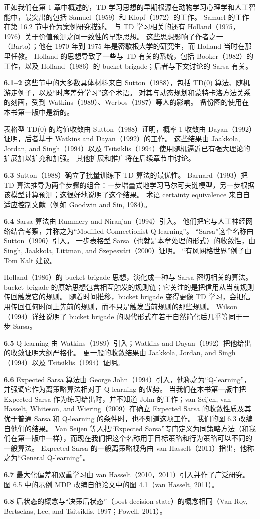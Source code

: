 \documentclass[UTF8, 12pt, fontset=fandol, oneside]{ctexart}
\begin{document}
正如我们在第 1 章中概述的，TD 学习思想的早期根源在动物学习心理学和人工智能中，最突出的包括 Samuel（1959）和 Klopf（1972）的工作。
Samuel 的工作在第 16.2 节中作为案例研究描述。
与 TD 学习相关的还有 Holland（1975，1976）关于价值预测之间一致性的早期思想。
这些思想影响了作者之一（Barto）；他在 1970 年到 1975 年是密歇根大学的研究生，而 Holland 当时在那里任教。
Holland 的思想导致了一些与 TD 有关的系统，包括 Booker（1982）的工作，以及 Holland（1986）的 bucket brigade；后者与下文讨论的 Sarsa 有关。

\noindent\textbf{6.1--2}
这些节中的大多数具体材料来自 Sutton（1988），包括 TD(0) 算法、随机游走例子，以及“时序差分学习”这个术语。
对其与动态规划和蒙特卡洛方法关系的刻画，受到 Watkins（1989）、Werbos（1987）等人的影响。
备份图的使用在本书第一版中是新的。

表格型 TD(0) 的均值收敛由 Sutton（1988）证明，概率 1 收敛由 Dayan（1992）证明，后者基于 Watkins and Dayan（1992）的工作。
这些结果由 Jaakkola, Jordan, and Singh（1994）以及 Tsitsiklis（1994）使用随机逼近已有强大理论的扩展加以扩充和加强。
其他扩展和推广将在后续章节中讨论。

\noindent\textbf{6.3}
Sutton（1988）确立了批量训练下 TD 算法的最优性。
Barnard（1993）把 TD 算法推导为两个步骤的组合：一步增量式地学习马尔可夫链模型，另一步根据该模型计算预测；这很好地说明了这个结果。
术语 certainty equivalence 来自自适应控制文献（例如 Goodwin and Sin, 1984）。

\noindent\textbf{6.4}
Sarsa 算法由 Rummery and Niranjan（1994）引入。
他们把它与人工神经网络结合考察，并称之为“Modified Connectionist Q-learning”。
“Sarsa”这个名称由 Sutton（1996）引入。
一步表格型 Sarsa（也就是本章处理的形式）的收敛性，由 Singh, Jaakkola, Littman, and Szepesvári（2000）证明。
“有风网格世界”例子由 Tom Kalt 建议。

Holland（1986）的 bucket brigade 思想，演化成一种与 Sarsa 密切相关的算法。
bucket brigade 的原始思想包含相互触发的规则链；它关注的是把信用从当前规则传回触发它的规则。
随着时间推移，bucket brigade 变得更像 TD 学习，会把信用传回任何时间上先前的规则，而不只是触发当前规则的那些规则。
Wilson（1994）详细说明了 bucket brigade 的现代形式在若干自然简化后几乎等同于一步 Sarsa。

\noindent\textbf{6.5}
Q-learning 由 Watkins（1989）引入；Watkins and Dayan（1992）把他给出的收敛证明大纲严格化。
更一般的收敛结果由 Jaakkola, Jordan, and Singh（1994）以及 Tsitsiklis（1994）证明。

\noindent\textbf{6.6}
Expected Sarsa 算法由 George John（1994）引入，他称之为“Q-learning”，并强调它作为离策略算法相对于 Q-learning 的优势。
当我们在本书第一版中把 Expected Sarsa 作为练习给出时，并不知道 John 的工作；van Seijen, van Hasselt, Whiteson, and Wiering（2009）在确立 Expected Sarsa 的收敛性质及其优于普通 Sarsa 和 Q-learning 的条件时，也不知道这项工作。
我们的图 6.3 改编自他们的结果。
Van Seijen 等人把“Expected Sarsa”专门定义为同策略方法（和我们在第一版中一样），而现在我们把这个名称用于目标策略和行为策略可以不同的一般算法。
Expected Sarsa 的一般离策略视角由 van Hasselt（2011）指出，他称之为“General Q-learning”。

\noindent\textbf{6.7}
最大化偏差和双重学习由 van Hasselt（2010，2011）引入并作了广泛研究。
图 6.5 中的示例 MDP 改编自他论文中的图 4.1（van Hasselt, 2011）。

\noindent\textbf{6.8}
后状态的概念与“决策后状态”（post-decision state）的概念相同（Van Roy, Bertsekas, Lee, and Tsitsiklis, 1997；Powell, 2011）。
\end{document}
